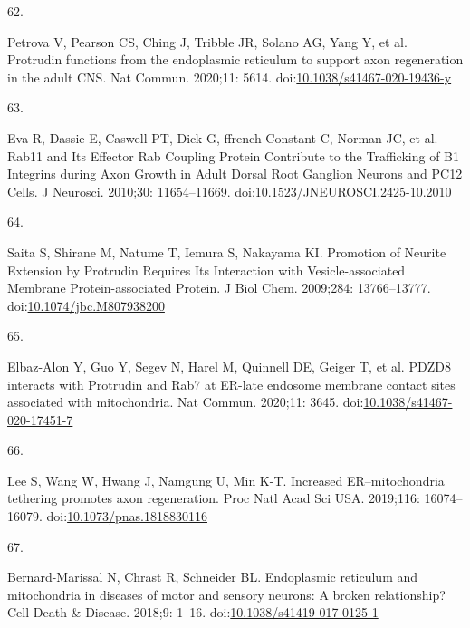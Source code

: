 \documentclass[
  12pt,
  a4paper,
]{book}
\newlength{\cslhangindent}
\newlength{\csllabelwidth}
\newenvironment{CSLReferences}[2] %
 {\begin{list}{}{%
  \setlength{\itemindent}{0pt}
  \setlength{\leftmargin}{0pt}
  \setlength{\parsep}{0pt}
  \ifodd #1
   \setlength{\leftmargin}{\cslhangindent}
   \setlength{\itemindent}{-1\cslhangindent}
  \fi
  \setlength{\itemsep}{#2\baselineskip}}}
 {\end{list}}
\newcommand{\CSLLeftMargin}[1]{\parbox[t]{\csllabelwidth}{\strut#1\strut}}
\newcommand{\CSLRightInline}[1]{\parbox[t]{\linewidth - \csllabelwidth}{\strut#1\strut}}
\begin{document}
\begin{CSLReferences}{0}{1}
\CSLLeftMargin{62. }%
\CSLRightInline{Petrova V, Pearson CS, Ching J, Tribble JR, Solano AG, Yang Y, et al. Protrudin functions from the endoplasmic reticulum to support axon regeneration in the adult {CNS}. Nat Commun. 2020;11: 5614. doi:\href{https://doi.org/10.1038/s41467-020-19436-y}{10.1038/s41467-020-19436-y}}

\CSLLeftMargin{63. }%
\CSLRightInline{Eva R, Dassie E, Caswell PT, Dick G, ffrench-Constant C, Norman JC, et al. Rab11 and {Its Effector Rab Coupling Protein Contribute} to the {Trafficking} of Β1 {Integrins} during {Axon Growth} in {Adult Dorsal Root Ganglion Neurons} and {PC12 Cells}. J Neurosci. 2010;30: 11654--11669. doi:\href{https://doi.org/10.1523/JNEUROSCI.2425-10.2010}{10.1523/JNEUROSCI.2425-10.2010}}

\CSLLeftMargin{64. }%
\CSLRightInline{Saita S, Shirane M, Natume T, Iemura S, Nakayama KI. Promotion of {Neurite Extension} by {Protrudin Requires Its Interaction} with {Vesicle-associated Membrane Protein-associated Protein}. J Biol Chem. 2009;284: 13766--13777. doi:\href{https://doi.org/10.1074/jbc.M807938200}{10.1074/jbc.M807938200}}

\CSLLeftMargin{65. }%
\CSLRightInline{Elbaz-Alon Y, Guo Y, Segev N, Harel M, Quinnell DE, Geiger T, et al. {PDZD8} interacts with {Protrudin} and {Rab7} at {ER-late} endosome membrane contact sites associated with mitochondria. Nat Commun. 2020;11: 3645. doi:\href{https://doi.org/10.1038/s41467-020-17451-7}{10.1038/s41467-020-17451-7}}

\CSLLeftMargin{66. }%
\CSLRightInline{Lee S, Wang W, Hwang J, Namgung U, Min K-T. Increased {ER}--mitochondria tethering promotes axon regeneration. Proc Natl Acad Sci USA. 2019;116: 16074--16079. doi:\href{https://doi.org/10.1073/pnas.1818830116}{10.1073/pnas.1818830116}}

\CSLLeftMargin{67. }%
\CSLRightInline{Bernard-Marissal N, Chrast R, Schneider BL. Endoplasmic reticulum and mitochondria in diseases of motor and sensory neurons: A broken relationship? Cell Death \& Disease. 2018;9: 1--16. doi:\href{https://doi.org/10.1038/s41419-017-0125-1}{10.1038/s41419-017-0125-1}}


\end{CSLReferences}
\end{document}
